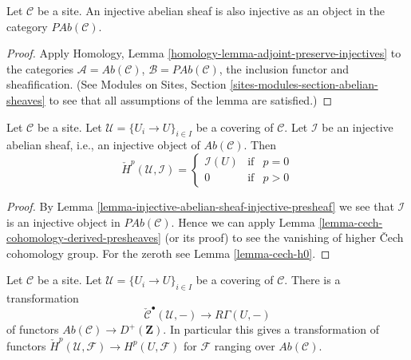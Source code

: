 \begin{lemma}
\label{lemma-injective-abelian-sheaf-injective-presheaf}
Let $\mathcal{C}$ be a site. An injective abelian sheaf is also injective as an
object in the category $\textit{PAb}(\mathcal{C})$.
\end{lemma}

\begin{proof}
Apply Homology, Lemma \ref{homology-lemma-adjoint-preserve-injectives}
to the categories $\mathcal{A} = \textit{Ab}(\mathcal{C})$,
$\mathcal{B} = \textit{PAb}(\mathcal{C})$, the inclusion functor
and sheafification. (See
Modules on Sites, Section \ref{sites-modules-section-abelian-sheaves} to see
that all assumptions of the lemma are satisfied.)
\end{proof}

\begin{lemma}
\label{lemma-injective-trivial-cech}
Let $\mathcal{C}$ be a site.
Let $\mathcal{U} = \{U_i \to U\}_{i \in I}$ be a covering of $\mathcal{C}$.
Let $\mathcal{I}$ be an injective abelian sheaf, i.e., an injective
object of $\textit{Ab}(\mathcal{C})$.
Then
$$
\check{H}^p(\mathcal{U}, \mathcal{I}) =
\left\{
\begin{matrix}
\mathcal{I}(U) & \text{if} & p = 0 \\
0 & \text{if} & p > 0
\end{matrix}
\right.
$$
\end{lemma}

\begin{proof}
By Lemma \ref{lemma-injective-abelian-sheaf-injective-presheaf}
we see that $\mathcal{I}$ is an injective object in
$\textit{PAb}(\mathcal{C})$.
Hence we can apply Lemma \ref{lemma-cech-cohomology-derived-presheaves}
(or its proof) to see the vanishing of higher {\v C}ech cohomology group.
For the zeroth see Lemma \ref{lemma-cech-h0}.
\end{proof}

\begin{lemma}
\label{lemma-cech-cohomology}
Let $\mathcal{C}$ be a site.
Let $\mathcal{U} = \{U_i \to U\}_{i \in I}$ be a covering of $\mathcal{C}$.
There is a transformation
$$
\check{\mathcal{C}}^\bullet(\mathcal{U}, -)
\longrightarrow
R\Gamma(U, -)
$$
of functors
$\textit{Ab}(\mathcal{C}) \to D^{+}(\mathbf{Z})$.
In particular this gives a transformation of functors
$\check{H}^p(\mathcal{U}, \mathcal{F}) \to H^p(U, \mathcal{F})$ for
$\mathcal{F}$ ranging over $\textit{Ab}(\mathcal{C})$.
\end{lemma}


